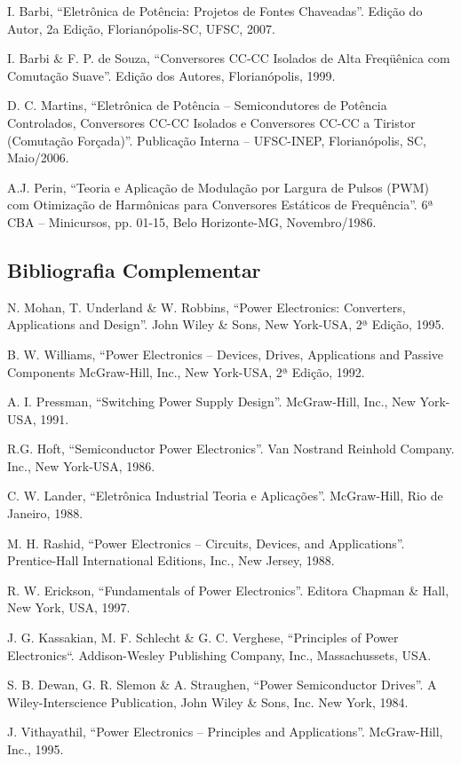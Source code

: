 \documentclass[
	article,			%
	12pt,				%
	twoside,			%
	a4paper,			%
	english,			%
	brazil,				%
	sumario=tradicional
]{abntex2-modelo-plano-de-aula}
\begin{document}
I. Barbi, “Eletrônica de Potência: Projetos de Fontes Chaveadas”. Edição do
Autor, 2a Edição, Florianópolis-SC, UFSC, 2007.

I. Barbi \& F. P. de Souza, “Conversores CC-CC Isolados de Alta Freqüênica
com Comutação Suave”. Edição dos Autores, Florianópolis, 1999.

D. C. Martins, “Eletrônica de Potência – Semicondutores de Potência
Controlados, Conversores CC-CC Isolados e Conversores CC-CC a Tiristor
(Comutação Forçada)”. Publicação Interna – UFSC-INEP, Florianópolis, SC,
Maio/2006.

A.J. Perin, “Teoria e Aplicação de Modulação por Largura de Pulsos (PWM)
com Otimização de Harmônicas para Conversores Estáticos de Frequência”. 6ª
CBA – Minicursos, pp. 01-15, Belo Horizonte-MG, Novembro/1986.



\subsection{Bibliografia Complementar}
N. Mohan, T. Underland \& W. Robbins, “Power Electronics: Converters,
Applications and Design”. John Wiley \& Sons, New York-USA, 2ª Edição, 1995.

B. W. Williams, “Power Electronics – Devices, Drives, Applications and Passive
Components McGraw-Hill, Inc., New York-USA, 2ª Edição, 1992.

A. I. Pressman, “Switching Power Supply Design”. McGraw-Hill, Inc., New York-
USA, 1991.

R.G. Hoft, “Semiconductor Power Electronics”. Van Nostrand Reinhold
Company. Inc., New York-USA, 1986.

C. W. Lander, “Eletrônica Industrial Teoria e Aplicações”. McGraw-Hill, Rio de
Janeiro, 1988.

M. H. Rashid, “Power Electronics – Circuits, Devices, and Applications”.
Prentice-Hall International Editions, Inc., New Jersey, 1988.

R. W. Erickson, “Fundamentals of Power Electronics”. Editora Chapman \& Hall,
New York, USA, 1997.

J. G. Kassakian, M. F. Schlecht \& G. C. Verghese, “Principles of Power
Electronics“. Addison-Wesley Publishing Company, Inc., Massachussets, USA.

S. B. Dewan, G. R. Slemon \& A. Straughen, “Power Semiconductor Drives”. A
Wiley-Interscience Publication, John Wiley \& Sons, Inc. New York, 1984.

J. Vithayathil, “Power Electronics – Principles and Applications”. McGraw-Hill,
Inc., 1995.
\end{document}
